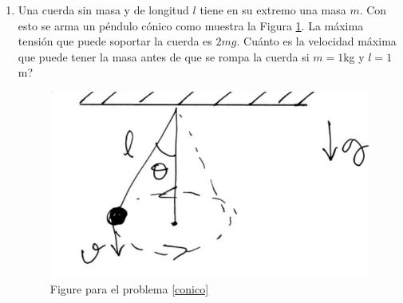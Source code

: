 \documentclass[letterpaper,10pt,onecolumn]{article}
\begin{document}
\begin{enumerate}
 \item \label{conico} Una cuerda sin masa y de longitud $l$ tiene en su extremo una masa $m$. Con esto se arma un p\'endulo c\'onico como muestra la Figura \ref{fig:conico}. La m\'axima tensi\'on que puede soportar la cuerda es
  $2mg$. Cu\'anto es la velocidad m\'axima que puede tener la masa antes de que se rompa la cuerda si $m=1$kg y $l=1$m?
 \begin{figure}[h]
\begin{center} 
\includegraphics[scale=0.25]{conico.png} 
\caption{\label{fig:conico}Figure para el problema \ref{conico}}
\end{center} 
\end{figure}
\end{enumerate}
\end{document}
